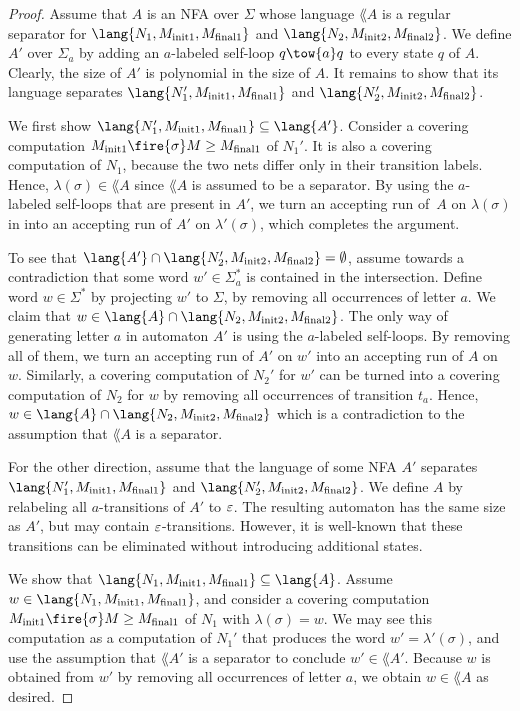 \documentclass[../../diss.tex]{subfiles}
\begin{document}
\begin{proof}
    Assume that $A$ is an NFA over $\Sigma$ whose language $\lang{A}$ is a regular separator for $\lang{N_1,M_{\init1},M_{\final1}}$ and $\lang{N_2,M_{\init2},M_{\final2}}$.
    We define $A'$ over $\Sigma_a$ by adding an $a$-labeled self-loop $q \tow{a} q$ to every state $q$ of $A$.
    Clearly, the size of $A'$ is polynomial in the size of $A$.
    It remains to show that its language separates $\lang{N_1',M_{\init1},M_{\final1}}$ and $\lang{N_2',M_{\init2},M_{\final2}}$.

    We first show $\lang{N_1',M_{\init1},M_{\final1}} \subseteq \lang{A'}$.
    Consider a covering computation $M_{\init1} \fire{\sigma} M \geq M_{\final1}$ of $N_1'$.
    It is also a covering computation of $N_1$, because the two nets differ only in their transition labels.
    Hence, $\lambda(\sigma) \in \lang{A}$ since $\lang{A}$ is assumed to be a separator.
    By using the $a$-labeled self-loops that are present in $A'$, we turn an accepting run of~$A$  on $\lambda(\sigma)$ in into an accepting run of $A'$ on $\lambda'(\sigma)$, which completes the argument.

    To see that $\lang{A'} \cap \lang{N_2',M_{\init2},M_{\final2}} = \emptyset$, assume towards a contradiction that some word $w' \in \Sigma_a^*$ is contained in the intersection.
    Define word $w \in \Sigma^*$ by projecting $w'$ to $\Sigma$, \ie by removing all occurrences of letter $a$.
    We claim that $w \in \lang{A} \cap \lang{N_2,M_{\init2},M_{\final2}}$.
    The only way of generating letter $a$ in automaton $A'$ is using the $a$-labeled self-loops.
    By removing all of them, we turn an accepting run of $A'$ on $w'$ into an accepting run of $A$ on $w$.
    Similarly, a covering computation of $N_2'$ for $w'$ can be turned into a covering computation of $N_2$ for $w$ by removing all occurrences of transition $t_a$.
    Hence, $w \in \lang{A} \cap \lang{N_2,M_{\init2},M_{\final2}}$ which is a contradiction to the assumption that $\lang{A}$ is a separator.

    For the other direction, assume that the language of some NFA $A'$ separates $\lang{N_1',M_{\init1},M_{\final1}}$ and $\lang{N_2',M_{\init2},M_{\final2}}$.
    We define $A$ by relabeling all $a$-transitions of $A'$ to $\varepsilon$.
    The resulting automaton has the same size as $A'$, but may contain $\varepsilon$-transitions.
    However, it is well-known that these transitions can be eliminated without introducing additional states.

    We show that $\lang{N_1,M_{\init1},M_{\final1}} \subseteq \lang{A}$.
    Assume $w \in \lang{N_1,M_{\init1},M_{\final1}}$, and consider a covering computation $M_{\init1} \fire{\sigma} M \geq M_{\final1}$ of $N_1$ with $\lambda(\sigma) = w$.
    We may see this computation as a computation of $N_1'$ that produces the word $w' = \lambda'(\sigma)$, and use the assumption that $\lang{A'}$ is a separator to conclude $w' \in \lang{A'}$.
    Because $w$ is obtained from $w'$ by removing all occurrences of letter $a$, we obtain $w \in \lang{A}$ as desired.


\end{proof}
\end{document}

